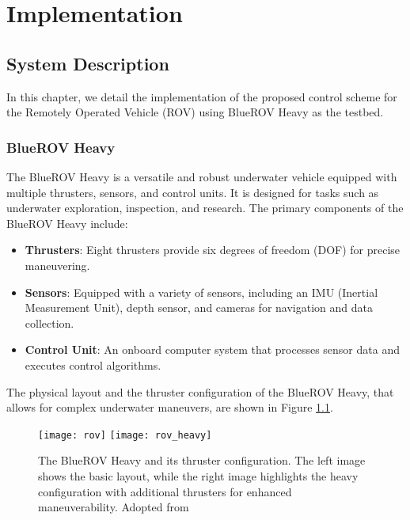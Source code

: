 \chapter{Implementation}
\label{chap:impl}

\section{System Description}

In this chapter, we detail the implementation of the proposed control scheme for the Remotely Operated Vehicle (ROV) using BlueROV Heavy as the testbed.

\subsection{BlueROV Heavy}

    The BlueROV Heavy is a versatile and robust underwater vehicle equipped with multiple thrusters, sensors, and control units. It is designed for tasks such as underwater exploration, inspection, and research. The primary components of the BlueROV Heavy include:

    \begin{itemize}
        \item \textbf{Thrusters}: Eight thrusters provide six degrees of freedom (DOF) for precise maneuvering.
        \item \textbf{Sensors}: Equipped with a variety of sensors, including an IMU (Inertial Measurement Unit), depth sensor, and cameras for navigation and data collection.
        \item \textbf{Control Unit}: An onboard computer system that processes sensor data and executes control algorithms.
    \end{itemize}

    The physical layout and the thruster configuration of the BlueROV Heavy, that allows for complex underwater maneuvers, are shown in Figure \ref{image:rov}.

    \begin{figure}[H]
        \begin{center}
            \texttt{[image: rov]}
            \texttt{[image: rov\_heavy]}
        \end{center}
        \caption{The BlueROV Heavy and its thruster configuration. The left image shows the basic layout, while the right image highlights the heavy configuration with additional thrusters for enhanced maneuverability. Adopted from \cite{bluerobotics}}
        \label{image:rov}
    \end{figure}

